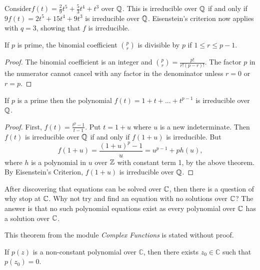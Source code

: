 \begin{example}
Consider$
f(t) = \frac{2}{9} t^5 + \frac{5}{3} t^4 + t^3 
$ over $\mathbb Q$. This is irreducible over $\mathbb Q$ if and only if $
9f(t) = 2t^5 + 15t^4 + 9t^3
$
is irreducible over $\mathbb Q$. Eisenstein's criterion now applies with $q = 3$, showing that $f$ is irreducible.
\end{example}

\begin{theorem}
If $p$ is prime, the binomial coefficient $\binom{p}{r}$ is divisible by $p$ if $1 \le r \le p-1$.
\end{theorem}

\begin{proof}
The binomial coefficient is an integer and $\binom{p}{r} = \frac{p!}{r!(p-r)!}$. The factor $p$ in the numerator cannot cancel with any factor in the denominator unless $r=0$ or $r=p$.
\end{proof}

\begin{theorem}\label{thm:irreducible-prime-polynomial}
    If $p$ is a prime then the polynomial
    $
    f(t) = 1 + t + ... + t^{p-1}
    $
    is irreducible over $\mathbb Q$.
\end{theorem}

\begin{proof}
First, $f(t) = \frac{t^p - 1}{t - 1}$. Put $t = 1 + u$ where $u$ is a new indeterminate. Then $f(t)$ is irreducible over $\mathbb Q$ if and only if $f(1+u)$ is irreducible. But
$$
f(1+u) = \frac{(1+u)^p - 1}{u}  = u^{p-1} + ph(u),
$$
where $h$ is a polynomial in $u$ over $\mathbb Z$ with constant term 1, by the above theorem. By Eisenstein's Criterion, $f(1+u)$ is irreducible over $\mathbb Q$.
\end{proof}

After discovering that equations can be solved over $\mathbb C$, then there is a question of why stop at $\mathbb C$. Why not try and find an equation with no solutions over $\mathbb C$? The answer is that no such polynomial equations exist as every polynomial over $\mathbb C$ has a solution over $\mathbb C$.

This theorem from the module \textit{Complex Functions} is stated without proof. 

\begin{theorem} \label{thm:fundamental-algebra}
	If $p(z)$ is a non-constant polynomial over $\mathbb{C}$, then there exists $z_0 \in \mathbb{C}$ such that $p\left(z_0\right)=0$.
\end{theorem}

